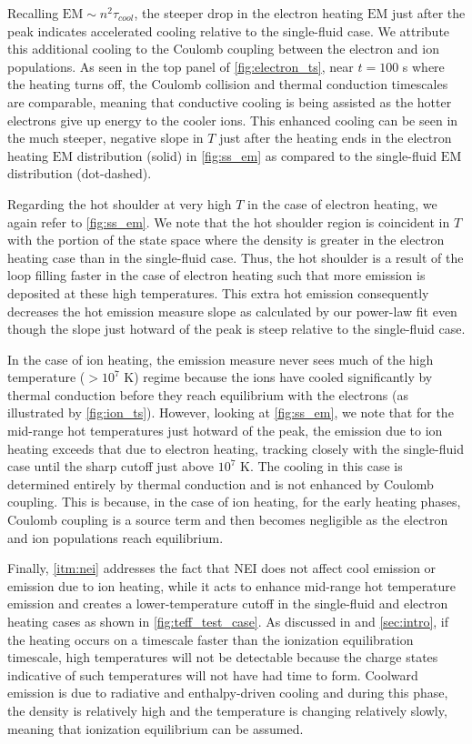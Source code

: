 \documentclass[apj]{emulateapj}
\begin{document}
	\par Recalling $\mathrm{EM}\sim n^2\tau_{cool}$, the steeper drop in the electron heating $\mathrm{EM}$ just after the peak indicates accelerated cooling relative to the single-fluid case. We attribute this additional cooling to the Coulomb coupling between the electron and ion populations. As seen in the top panel of \autoref{fig:electron_ts}, near $t=100$ s where the heating turns off, the Coulomb collision and thermal conduction timescales are comparable, meaning that conductive cooling is being assisted as the hotter electrons give up energy to the cooler ions. This enhanced cooling can be seen in the much steeper, negative slope in $T$ just after the heating ends in the electron heating $\mathrm{EM}$ distribution (solid) in \autoref{fig:ss_em} as compared to the single-fluid $\mathrm{EM}$ distribution (dot-dashed).
	\par Regarding the hot shoulder at very high $T$ in the case of electron heating, we again refer to \autoref{fig:ss_em}. We note that the hot shoulder region is coincident in $T$ with the portion of the state space where the density is greater in the electron heating case than in the single-fluid case. Thus, the hot shoulder is a result of the loop filling faster in the case of electron heating such that more emission is deposited at these high temperatures. This extra hot emission consequently decreases the hot emission measure slope as calculated by our power-law fit even though the slope just hotward of the peak is steep relative to the single-fluid case.
	\par In the case of ion heating, the emission measure never sees much of the high temperature ($>10^7$ K) regime because the ions have cooled significantly by thermal conduction before they reach equilibrium with the electrons (as illustrated by \autoref{fig:ion_ts}). However, looking at \autoref{fig:ss_em}, we note that for the mid-range hot temperatures just hotward of the peak, the emission due to ion heating exceeds that due to electron heating, tracking closely with the single-fluid case until the sharp cutoff just above $10^7$ K. The cooling in this case is determined entirely by thermal conduction and is not enhanced by Coulomb coupling. This is because, in the case of ion heating, for the early heating phases, Coulomb coupling is a source term and then becomes negligible as the electron and ion populations reach equilibrium.
	\par Finally, \autoref{itm:nei} addresses the fact that NEI does not affect cool emission or emission due to ion heating, while it acts to enhance mid-range hot temperature emission and creates a lower-temperature cutoff in the single-fluid and electron heating cases as shown in \autoref{fig:teff_test_case}. As discussed in  and \autoref{sec:intro}, if the heating occurs on a timescale faster than the ionization equilibration timescale, high temperatures will not be detectable because the charge states indicative of such temperatures will not have had time to form. Coolward emission is due to radiative and enthalpy-driven cooling and during this phase, the density is relatively high and the temperature is changing relatively slowly, meaning that ionization equilibrium can be assumed. 
\end{document}
